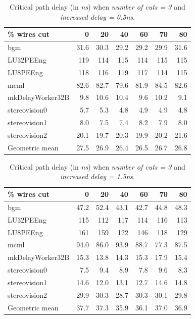 \documentclass{sig-alternate-2013}
\begin{document}
\begin{table}[!htbp]
\begin{tabular}{|l|r|r|r|r|r|r|}
\hline
\% wires cut & 0 & 20 & 40 & 60 & 70 & 80 \\ \hline \hline
bgm & 31.6 & 30.3 & 29.2 & 29.2 & 29.9 & 31.6 \\ \hline
LU32PEEng & 119 & 114 & 115 & 114 & 115 & 115 \\ \hline
LU8PEEng & 118 & 116 & 119 & 117 & 114 & 115 \\ \hline
mcml & 82.6 & 82.7 & 79.6 & 81.9 & 84.5 & 82.6 \\ \hline
mkDelayWorker32B & 9.8 & 10.6 & 10.4 & 9.6 & 10.2 & 9.1 \\ \hline
stereovision0 & 5.7 & 5.3 & 4.8 & 4.9 & 4.9 & 4.8 \\ \hline
stereovision1 & 8.0 & 7.5 & 7.4 & 8.2 & 7.9 & 8.0 \\ \hline
stereovision2 & 20.1 & 19.7 & 20.3 & 19.9 & 20.2 & 21.6 \\ \hline
Geometric mean & 27.5 & 26.9 & 26.4 & 26.5 & 26.7 & 26.8 \\ \hline
\end{tabular}
\caption{Critical path delay (in \textit{ns}) when \textit{number of cuts = 3} and \textit{increased delay = 0.5ns}.}
\label{table:delay500}
\end{table}

\begin{table}[!htbp]
\begin{tabular}{|l|r|r|r|r|r|r|}
\hline
\% wires cut & 0 & 20 & 40 & 60 & 70 & 80 \\ \hline \hline
bgm & 47.2 & 52.4 & 43.1 & 42.7 & 44.8 & 48.3 \\ \hline
LU32PEEng & 115 & 112 & 117 & 114 & 116 & 113 \\ \hline
LU8PEEng & 161 & 159 & 122 & 146 & 118 & 129 \\ \hline
mcml & 94.0 & 86.0 & 93.9 & 88.7 & 77.3 & 87.5 \\ \hline
mkDelayWorker32B & 15.3 & 13.8 & 14.3 & 15.3 & 17.9 & 15.4 \\ \hline
stereovision0 & 7.5 & 9.4 & 8.9 & 7.8 & 9.6 & 8.3 \\ \hline
stereovision1 & 14.6 & 12.0 & 13.1 & 12.7 & 14.6 & 14.8 \\ \hline
stereovision2 & 29.9 & 30.3 & 28.7 & 30.3 & 30.1 & 29.8 \\ \hline
Geometric mean & 37.7 & 37.3 & 35.9 & 36.1 & 37.0 & 36.9 \\ \hline
\end{tabular}
\caption{Critical path delay (in \textit{ns}) when \textit{number of cuts = 3} and \textit{increased delay = 1.5ns}.}
\label{table:delay1500}
\end{table}
\end{document}
